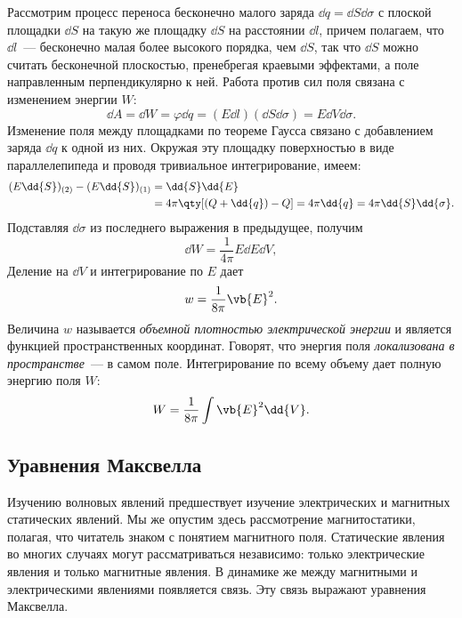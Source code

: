 \documentclass[\docroot/reports/lectures-draft/report.tex]{subfiles}
\begin{document}
    Рассмотрим процесс переноса бесконечно малого заряда $\dd{q} = \dd{S} \dd{\sigma}$ с плоской площадки $\dd{S}$ на такую же площадку $\dd{S}$ на расстоянии $\dd{l}$, причем полагаем, что $\dd{l}$~--- бесконечно малая более высокого порядка, чем $\dd{S}$, так что $\dd{S}$ можно считать бесконечной плоскостью, пренебрегая краевыми эффектами, а поле направленным перпендикулярно к ней. Работа против сил поля связана с изменением энергии $W$:
    \begin{equation*}
        \dd{A} = \dd{W} = \varphi \dd{q} = (E \dd{l}) (\dd{S} \dd{\sigma}) = E \dd{V} \dd{\sigma} .
    \end{equation*}
    Изменение поля между площадками по теореме Гаусса связано с добавлением заряда $\dd{q}$ к одной из них. Окружая эту площадку поверхностью в виде параллелепипеда и проводя тривиальное интегрирование, имеем:
    \begin{equation*}\begin{aligned}
        (E \dd{S})_{(2)} - (E \dd{S})_{(1)} &= \dd{S} \dd{E} \\ &= 4 \pi \qty[(Q + \dd{q}) - Q] = 4 \pi \dd{q} = 4 \pi \dd{S} \dd{\sigma} .
    \end{aligned}\end{equation*}
    Подставляя $\dd{\sigma}$ из последнего выражения в предыдущее, получим
    \begin{equation*}
        \dd{W} = \frac{1}{4 \pi} E \dd{E} \dd{V} ,
    \end{equation*}
    Деление на $\dd{V}$ и интегрирование по $E$ дает
    \begin{equation*}
        w = \frac{1}{8 \pi} \vb{E}^2 .
    \end{equation*}
    Величина $w$ называется \textit{объемной плотностью электрической энергии} и является функцией пространственных координат. Говорят, что энергия поля \textit{локализована в пространстве}~--- в самом поле. Интегрирование по всему объему дает полную энергию поля $W$:
    \begin{equation*}
        W = \frac{1}{8 \pi} \int \vb{E}^2 \dd{V} .
    \end{equation*}

\subsection{Уравнения Максвелла}

    Изучению волновых явлений предшествует изучение электрических и магнитных статических явлений. Мы же опустим здесь рассмотрение магнитостатики, полагая, что читатель знаком с понятием магнитного поля. Статические явления во многих случаях могут рассматриваться независимо: только электрические явления и только магнитные явления. В динамике же между магнитными и электрическими явлениями появляется связь. Эту связь выражают уравнения Максвелла.
\end{document}
